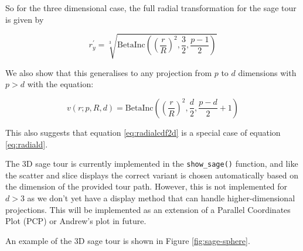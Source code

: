 So for the three dimensional case, the full radial transformation for the sage tour is given by

\begin{equation}
r_y^\prime = \sqrt[3]{\mathrm{BetaInc}\left(\left(\frac{r}{R}\right)^2, \frac{3}{2}, \frac{p-1}{2}\right)}
\label{eq:radial3}
\end{equation}

We also show that this generalises to any projection from \(p\) to \(d\) dimensions with \(p>d\) with the equation:

\begin{equation}
v(r; p, R, d) = \mathrm{BetaInc}\left(\left(\frac{r}{R}\right)^2, \frac{d}{2}, \frac{p-d}{2}+1\right)
\label{eq:radiald}
\end{equation}

This also suggests that equation \eqref{eq:radialcdf2d} is a special case of equation \eqref{eq:radiald}.

The 3D sage tour is currently implemented in the \texttt{show\_sage()} function, and like the scatter and slice displays the correct variant is chosen automatically based on the dimension of the provided tour path. However, this is not implemented for \(d>3\) as we don't yet have a display method that can handle higher-dimensional projections. This will be implemented as an extension of a Parallel Coordinates Plot (PCP) or Andrew's plot in future.

An example of the 3D sage tour is shown in Figure \ref{fig:sage-sphere}.

